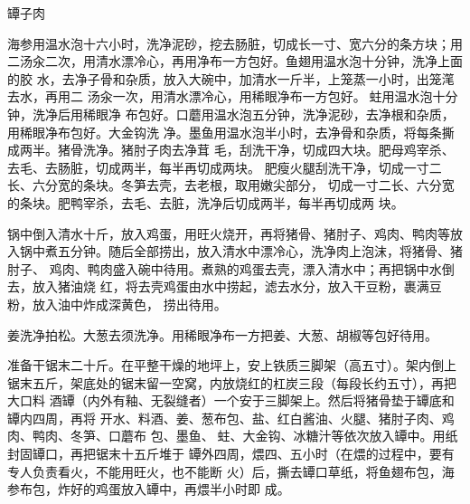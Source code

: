 \begin{recipe}{罈子肉}

\ingredients


\preparation

\step 海参用温水泡十六小时，洗净泥砂，挖去肠脏，切成长一寸、宽六分的条方块；用
二汤汆二次，用清水漂冷心，再用净布一方包好。鱼翅用温水泡十分钟，洗净上面的胶
水，去净子骨和杂质，放入大碗中，加清水一斤半，上笼蒸一小时，出笼滗去水，再用二
汤汆一次，用清水漂冷心，用稀眼净布一方包好。𧎼蛀用温水泡十分钟，洗净后用稀眼净
布包好。口蘑用温水泡五分钟，洗净泥砂，去净根和杂质，用稀眼净布包好。大金钩洗
净。墨鱼用温水泡半小时，去净骨和杂质，将每条撕成两半。猪骨洗净。猪肘子肉去净茸
毛，刮洗干净，切成四大块。肥母鸡宰杀、去毛、去肠脏，切成两半，每半再切成两块。
肥瘦火腿刮洗干净，切成一寸二长、六分宽的条块。冬笋去壳，去老根，取用嫩尖部分，
切成一寸二长、六分宽的条块。肥鸭宰杀，去毛、去脏，洗净后切成两半，每半再切成两
块。

\step 锅中倒入清水十斤，放入鸡蛋，用旺火烧开，再将猪骨、猪肘子、鸡肉、鸭肉等放
入锅中煮五分钟。随后全部捞出，放入清水中漂冷心，洗净肉上泡沫，将猪骨、猪肘子、
鸡肉、鸭肉盛入碗中待用。煮熟的鸡蛋去壳，漂入清水中；再把锅中水倒去，放入猪油烧
红，将去壳鸡蛋由水中捞起，滤去水分，放入干豆粉，裹满豆粉，放入油中炸成深黄色，
捞出待用。

\step 姜洗净拍松。大葱去须洗净。用稀眼净布一方把姜、大葱、胡椒等包好待用。

\step 准备干锯末二十斤。在平整干燥的地坪上，安上铁质三脚架（高五寸）。架内倒上
锯末五斤，架底处的锯末留一空窝，内放烧红的杠炭三段（每段长约五寸），再把大口料
酒罈（内外有釉、无裂缝者）一个安于三脚架上。然后将猪骨垫于罈底和罈内四周，再将
开水、料酒、姜、葱布包、盐、红白酱油、火腿、猪肘子肉、鸡肉、鸭肉、冬笋、口蘑布
包、墨鱼、𧎼蛀、大金钩、冰糖汁等依次放入罈中。用纸封固罈口，再把锯末十五斤堆于
罈外四周，煨四、五小时（在煨的过程中，要有专人负责看火，不能用旺火，也不能断
火）后，撕去罈口草纸，将鱼翅布包，海参布包，炸好的鸡蛋放入罈中，再煨半小时即
成。


\end{recipe}
